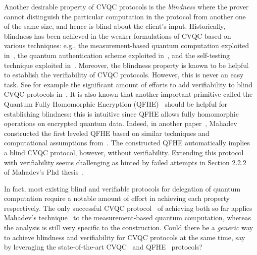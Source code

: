 Another desirable property of CVQC protocols is the \emph{blindness} where the prover cannot distinguish the particular computation in the protocol from another one of the same size, and hence is blind about the client's input.
Historically, blindness has been achieved in the weaker formulations of CVQC based on various techniques: e.g., the measurement-based quantum computation exploited in~\cite{BFK09}, the quantum authentication scheme exploited in~\cite{arXiv:ABOEM17}, and the self-testing technique exploited in~\cite{Nat:RUV13}.
Moreover, the blindness property is known to be helpful to establish the verifiability of CVQC protocols. However, this is never an easy task.
See for example the significant amount of efforts to add verifiability to blind CVQC protocols in~\cite{FK17}.
It is also known that another important primitive called the Quantum Fully Homomorphic Encryption (QFHE)~\cite{BJ15, DSS16, LC18, NS18, OTF18, mahadev_qfhe} should be helpful for establishing blindness: this is intuitive since QFHE allows fully homomorphic operations on encrypted quantum data. 
Indeed, in another paper~\cite{mahadev_qfhe}, Mahadev constructed the first leveled QFHE based on similar techniques and computational assumptions from~\cite{FOCS:Mahadev18a}.
The constructed QFHE automatically implies a blind CVQC protocol, however, without verifiability.
Extending this protocol with verifiability seems challenging as hinted by failed attempts in Section 2.2.2 of Mahadev's Phd thesis~\cite{mahadev_2018}.

In fact, most existing blind and verifiable protocols for delegation of quantum computation require a notable amount of effort in achieving each property respectively. 
The only successful CVQC protocol~\cite{FOCS:GheVid19} of achieving both so far applies Mahadev's technique~\cite{FOCS:Mahadev18a} to the measurement-based quantum computation, whereas the analysis is still very specific to the construction.
Could there be a \emph{generic} way to achieve blindness and verifiability for CVQC protocols at the same time, say by leveraging the state-of-the-art CVQC~\cite{FOCS:Mahadev18a} and QFHE~\cite{mahadev_qfhe} protocols? 




